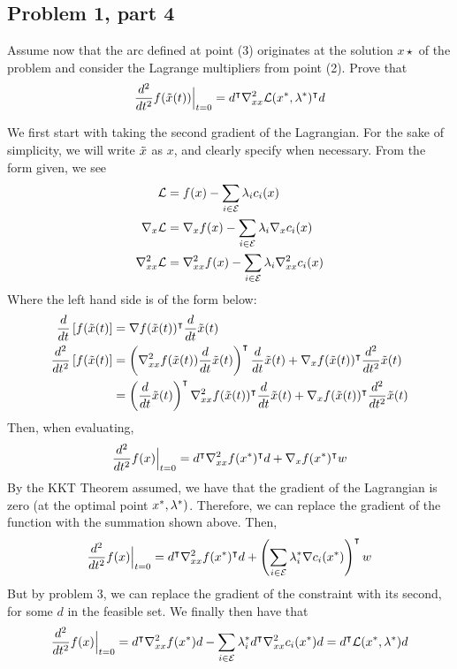 \subsection{Problem 1, part 4}
Assume now that the arc defined at point (3) originates at the solution $x\star$ of the problem and consider the Lagrange multipliers from point (2). Prove that
\[\frac{d^2}{dt^2}f(\Tilde{x}(t)) \Big|_{t = 0} = d^{\intercal} \nabla_{xx}^2 \mathcal{L} (x^{*}, \mathrm{\lambda}^{*})^{\intercal} d\]
\partbreak
\begin{solution}

    We first start with taking the second gradient of the Lagrangian. For the sake of simplicity, we will write $\Tilde{x}$ as $x$, and clearly specify when necessary. From the form given, we see
    \begin{align*}
        \mathcal{L} &= f(x) - \sum_{i \in \mathcal{E}} \mathrm{\lambda}_i c_i(x) \\
        \nabla_x \mathcal{L} &= \nabla_x f(x) - \sum_{i \in \mathcal{E}} \mathrm{\lambda}_i \nabla_x c_i(x)\\
        \nabla_{xx}^2 \mathcal{L} &= \nabla_{xx}^2 f(x) - \sum_{i \in \mathcal{E}} \mathrm{\lambda}_i \nabla_{xx}^2 c_i(x)
    \end{align*}
    Where the left hand side is of the form below:
    \tightalignbreak
    \begin{align*}
        \frac{d}{dt}\left[ f(\Tilde{x}(t)\right] &= \nabla f(\Tilde{x}(t)) ^{\intercal} \frac{d}{dt}\Tilde{x}(t)\\
        \frac{d^2}{dt^2}\left[ f(\Tilde{x}(t) \right] &= \left( \nabla^2_{xx} f(\Tilde{x}(t)) \frac{d}{dt}\Tilde{x}(t)\right)^{\intercal} \frac{d}{dt}\Tilde{x}(t) + \nabla_{x} f(\Tilde{x}(t))^{\intercal} \frac{d^2}{dt^2}\Tilde{x}(t)\\
        &= \left(\frac{d}{dt}\Tilde{x}(t)\right)^{\intercal} \nabla^2_{xx} f(\Tilde{x}(t))^{\intercal} \frac{d}{dt}\Tilde{x}(t) + \nabla_{x} f(\Tilde{x}(t))^{\intercal} \frac{d^2}{dt^2}\Tilde{x}(t)
    \end{align*}
    \vspace{-12mm}\alignbreak
    Then, when evaluating,
    \[\frac{d^2}{dt^2}f(x)\Big|_{t=0} = d^{\intercal} \nabla^2_{xx} f(x^{*})^{\intercal} d + \nabla_x f(x^{*})^{\intercal} w\]
    By the KKT Theorem assumed, we have that the gradient of the Lagrangian is zero (at the optimal point $x^{*}, \mathrm{\lambda}^{*})$. Therefore, we can replace the gradient of the function with the summation shown above. Then,
    \[\frac{d^2}{dt^2}f(x)\Big|_{t=0} = d^{\intercal} \nabla^2_{xx} f(x^{*})^{\intercal} d + \left(\sum_{i \in \mathcal{E}} \mathrm{\lambda}_i^{*} \nabla c_i(x^{*})\right)^{\intercal} w\]
    But by problem 3, we can replace the gradient of the constraint with its second, for some $d$ in the feasible set. We finally then have that
    \[\frac{d^2}{dt^2}f(x)\Big|_{t=0} = d^{\intercal} \nabla_{xx}^2f(x^{*})d - \sum_{i \in \mathcal{E}} \mathrm{\lambda}_i^{*} d^{\intercal} \nabla_{xx}^2 c_i(x^{*})d = d^{\intercal} \mathcal{L}(x^{*}, \mathrm{\lambda}^{*})d\]
\end{solution}


